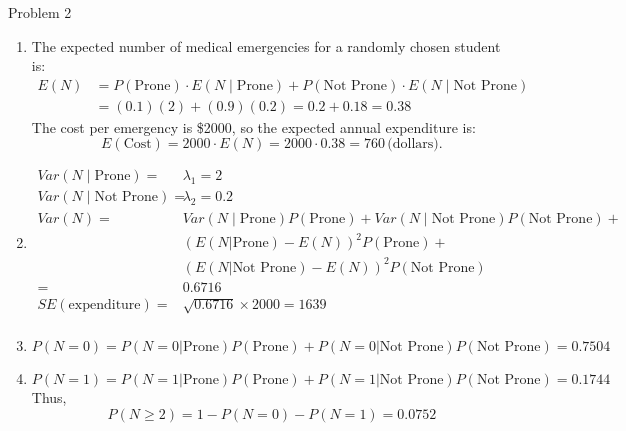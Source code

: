 \documentclass[12pt,letterpaper, onecolumn]{exam}
\begin{document}
\begin{questions}
    \question Problem 2
    \begin{solution}
    \begin{enumerate}
        \item The expected number of medical emergencies for a randomly chosen student is:
        \begin{align*}
            E(N) &= P(\text{Prone}) \cdot E(N \mid \text{Prone}) + P(\text{Not Prone}) \cdot E(N \mid \text{Not Prone}) \\
                & = (0.1)(2) + (0.9)(0.2) = 0.2 + 0.18 = 0.38
        \end{align*}
        The cost per emergency is \$2000, so the expected annual expenditure is:
        \[
        E(\text{Cost}) = 2000 \cdot E(N) = 2000 \cdot 0.38 = 760 \, \text{(dollars)}.
        \]
        \item \begin{align*}
        Var(N \mid \text{Prone}) =& \lambda_1 = 2 \\
        Var(N \mid \text{Not Prone}) =& \lambda_2 = 0.2 \\
        Var(N) =& Var(N \mid \text{Prone})P(\text{Prone}) + Var(N \mid \text{Not Prone})P(\text{Not Prone}) + \\
        & (E(N|\text{Prone})-E(N))^2P(\text{Prone}) + \\
        & (E(N|\text{Not Prone})-E(N))^2P(\text{Not Prone}) \\
        =& 0.6716 \\
        SE(\text{expenditure}) =& \sqrt{0.6716} \times 2000 = 1639 \\
        \end{align*}   
        \item $$P(N=0) = P(N=0|\text{Prone})P(\text{Prone}) + P(N=0|\text{Not Prone})P(\text{Not Prone}) = 0.7504 $$
        \item $$P(N=1) = P(N=1|\text{Prone})P(\text{Prone}) + P(N=1|\text{Not Prone})P(\text{Not Prone}) = 0.1744 $$
        Thus, $$P(N \geq 2) = 1- P(N=0) - P(N=1) = 0.0752$$
    \end{enumerate}
    \end{solution}
    

\end{questions}
\end{document}
